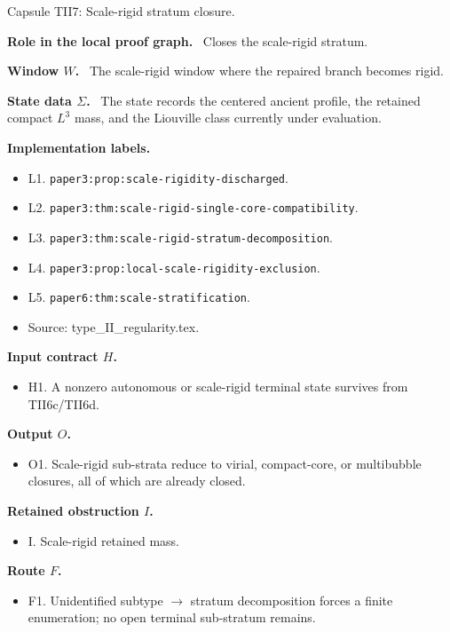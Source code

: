 \documentclass[11pt]{amsart}
\newcommand{\capsulefield}[1]{\par\smallskip\noindent\textbf{#1.}\ }
\begin{document}
\begin{proofcapsule}{Capsule TII7: Scale-rigid stratum closure.}
  \capsulefield{Role in the local proof graph}
  Closes the scale-rigid stratum.

  \capsulefield{Window \(W\)}
The scale-rigid window where the repaired branch becomes rigid.

  \capsulefield{State data \(\Sigma\)}
The state records the centered ancient profile, the retained compact $L^3$ mass, and the Liouville class currently under evaluation.

  \capsulefield{Implementation labels}
  \begin{itemize}[leftmargin=1.8em]
  \item L1. \texttt{paper3:prop:scale-rigidity-discharged}.
  \item L2. \texttt{paper3:thm:scale-rigid-single-core-compatibility}.
  \item L3. \texttt{paper3:thm:scale-rigid-stratum-decomposition}.
  \item L4. \texttt{paper3:prop:local-scale-rigidity-exclusion}.
  \item L5. \texttt{paper6:thm:scale-stratification}.
  \item Source: type\_II\_regularity.tex.
  \end{itemize}

  \capsulefield{Input contract \(H\)}
  \begin{itemize}[leftmargin=1.8em]
  \item H1. A nonzero autonomous or scale-rigid terminal state survives from TII6c/TII6d.
  \end{itemize}

  \capsulefield{Output \(O\)}
  \begin{itemize}[leftmargin=1.8em]
  \item O1. Scale-rigid sub-strata reduce to virial, compact-core, or multibubble closures, all of which are already closed.
  \end{itemize}

  \capsulefield{Retained obstruction \(I\)}
  \begin{itemize}[leftmargin=1.8em]
  \item I. Scale-rigid retained mass.
  \end{itemize}

  \capsulefield{Route \(F\)}
  \begin{itemize}[leftmargin=1.8em]
  \item F1. Unidentified subtype $\to$ stratum decomposition forces a finite enumeration; no open terminal sub-stratum remains.
  \end{itemize}


\end{proofcapsule}
\end{document}
